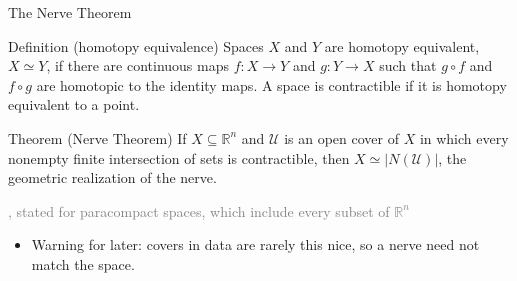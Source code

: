 \documentclass[aspectratio=169]{beamer}
\newcommand{\R}{\mathbb{R}}
\newcommand{\src}[1]{\par\vspace{2pt}\hfill{\scriptsize\textcolor{gray}{\parencite{#1}}}}
\begin{document}
\begin{frame}{The Nerve Theorem}
\begin{block}{Definition (homotopy equivalence)}
Spaces $X$ and $Y$ are \alert{homotopy equivalent}, $X \simeq Y$, if there are continuous maps $f : X \to Y$ and $g : Y \to X$ such that $g \circ f$ and $f \circ g$ are homotopic to the identity maps. A space is \alert{contractible} if it is homotopy equivalent to a point.
\src{hatcher2001}
\end{block}
\begin{block}{Theorem (Nerve Theorem)}
If $X \subseteq \R^n$ and $\mathcal U$ is an open cover of $X$ in which every nonempty finite intersection of sets is contractible, then $X \simeq |N(\mathcal U)|$, the geometric realization of the nerve.
\par\vspace{2pt}\hfill{\scriptsize\textcolor{gray}{\parencite[Cor.~4G.3]{hatcher2001}, stated for paracompact spaces, which include every subset of $\R^n$ \parencite[Thm.~41.4]{munkres2000topology}}}
\end{block}
\begin{itemize}\footnotesize
  \item \alert{Warning for later:} covers in data are rarely this nice, so a nerve need not match the space.
\end{itemize}
\end{frame}
\end{document}
